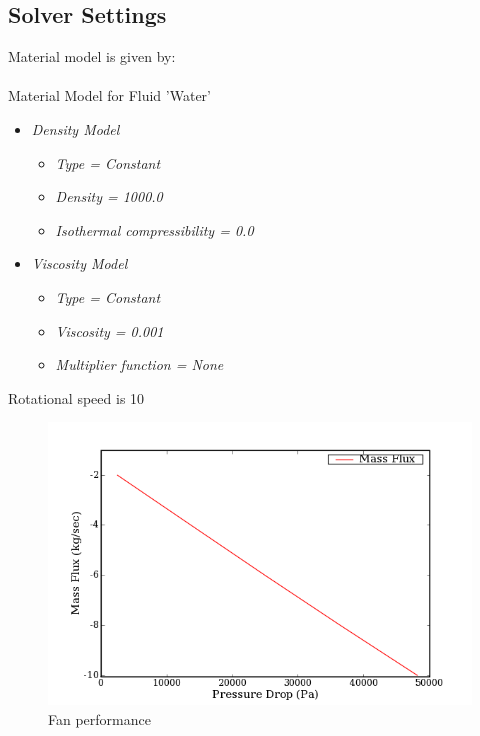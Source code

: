 \documentclass[letterpaper,12pt]{article}
\begin{document}
\subsection{Solver Settings}
Material model is given by:\\\\
Material Model for Fluid 'Water'\\
\begin{itemize}
\item{\emph{Density Model}}

\begin{itemize}
\item{\emph{Type = Constant}}

\item{\emph{Density = 1000.0}}

\item{\emph{Isothermal compressibility = 0.0}}

\end{itemize}
\item{\emph{Viscosity Model}}

\begin{itemize}
\item{\emph{Type = Constant}}

\item{\emph{Viscosity = 0.001}}

\item{\emph{Multiplier function = None}}

\end{itemize}
\end{itemize}
Rotational speed is 10\\
\begin{figure}[!h!tbp]
\begin{center}
\includegraphics[scale=0.751879699248]{./Figures/plot_1.png}
\caption{\label{fig:mp}Fan performance}
\end{center}
\end{figure}
\end{document}
